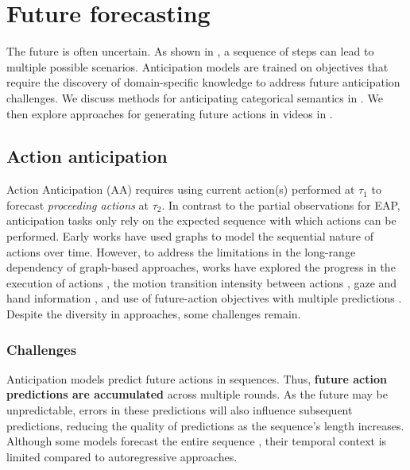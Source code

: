 \section{Future forecasting}
\label{sec:forecasting}

The future is often uncertain. As shown in , a sequence of steps can lead to multiple possible scenarios. Anticipation models are trained on objectives that require the discovery of domain-specific knowledge to address future anticipation challenges. We discuss methods for anticipating categorical semantics in . We then explore approaches for generating future actions in videos in .



\subsection{Action anticipation}
\label{sec:forecasting::anticipation}

Action Anticipation (AA) requires using current action(s) performed at $\tau_1$ to forecast \emph{proceeding actions} at $\tau_2$. In contrast to the partial observations for EAP, anticipation tasks only rely on the expected sequence with which actions can be performed. Early works \citep{kitani2012activity,kuehne2014language,koppula2015anticipating} have used graphs to model the sequential nature of actions over time. However, to address the limitations in the long-range dependency of graph-based approaches, works have explored the progress in the execution of actions \citep{abu2018will,furnari2019would,ke2019time}, the motion transition intensity between actions \citep{huang2014action}, gaze and hand information \citep{shen2018egocentric}, and use of future-action objectives with multiple predictions \citep{furnari2018leveraging,zatsarynna2024gated}. Despite the diversity in approaches, some challenges remain.

\subsubsection{Challenges}

Anticipation models predict future actions in sequences. Thus, \textbf{future action predictions are accumulated} across multiple rounds. As the future may be unpredictable, errors in these predictions will also influence subsequent predictions, reducing the quality of predictions as the sequence's length increases. Although some models forecast the entire sequence \citep{gong2022future,nawhal2022rethinking}, their temporal context is limited compared to autoregressive approaches.  

